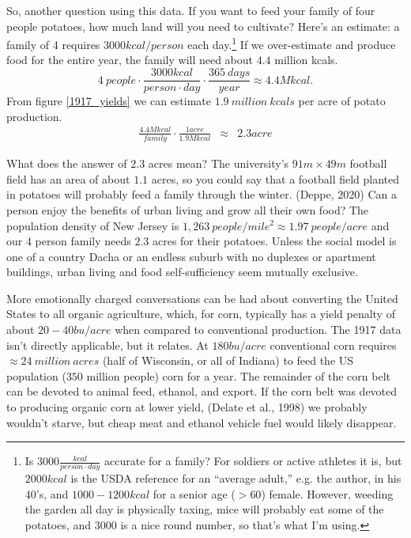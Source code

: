 \documentclass[man]{apa7}
\newcommand{\be}{\begin{equation}}
\newcommand{\ee}{\end{equation}}
\newcommand{\bea}{\begin{eqnarray}}
\newcommand{\eea}{\end{eqnarray}}
\begin{document}
So, another question using this data.  If you want to feed your family of four people potatoes, how much land will you need to cultivate?
Here's an estimate: a family of 4 requires $3000kcal/person$ each day.\footnote{
Is $3000\frac{kcal}{person\cdot day}$ accurate for a family?  For soldiers or active athletes it is, but $2000kcal$ is the USDA reference for an ``average adult,'' e.g. the author, in his 40's, and   $1000-1200kcal$ for a senior age ($>60$) female.  However, weeding the garden all day is physically taxing, mice will probably eat some of the potatoes, and $3000$ is a nice round number, so that's what I'm using.
}
If we over-estimate and produce food for the entire year, the family will need about $4.4$ million kcals.
\be
4~people\cdot\frac{3000kcal}{person\cdot day}\cdot\frac{365~days}{year} \approx 4.4 M kcal . 
\ee
From figure \ref{1917_yields} we can estimate $1.9~million~kcals$ per acre of potato production.  
\bea
\frac{4.4 M kcal}{family}\cdot\frac{1 acre}{1.9M kcal}  & \approx& 2.3 acre
\eea

What does the answer of $2.3$ acres mean?  The university's $91m\times49m$ football field has an area of about $1.1$ acres, so you could say that a football field planted in potatoes will probably feed a family through the winter. (Deppe, 2020)  Can a person enjoy the benefits of urban living and grow all their own food?  The population density of New Jersey is $1,263~people/mile^2 \approx1.97~people/acre$ and our 4 person family needs $2.3$ acres for their potatoes.  
Unless the social model is one of a country Dacha or an endless suburb with no duplexes or apartment buildings, urban living and food self-sufficiency seem mutually exclusive.


More emotionally charged conversations can be had about converting the United States to all organic agriculture, which, for corn, typically has a yield penalty of about $20-40bu/acre$ when compared to conventional production.  The 1917 data isn't directly applicable, but it relates. At $180bu/acre$ conventional corn requires $\approx 24~million~acres$ (half of Wisconsin, or all of Indiana) to feed the US population ($350$ million people) corn for a year.  The remainder of the corn belt can be devoted to animal feed, ethanol, and export.  If the corn belt was devoted to producing organic corn at lower yield, (Delate et al., 1998) we probably wouldn't starve, but cheap meat and ethanol vehicle fuel would likely disappear.   
\end{document}
